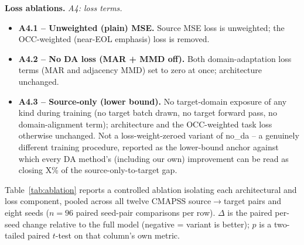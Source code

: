 \textbf{Loss ablations.}
\textit{A4: loss terms.}
\begin{itemize}
  \item \textbf{A4.1 -- Unweighted (plain) MSE.} Source MSE loss is unweighted; the OCC-weighted (near-EOL emphasis) loss is removed.
  \item \textbf{A4.2 -- No DA loss (MAR + MMD off).} Both domain-adaptation loss terms (MAR and adjacency MMD) set to zero at once; architecture unchanged.
  \item \textbf{A4.3 -- Source-only (lower bound).} No target-domain exposure of any kind during training (no target batch drawn, no target forward pass, no domain-alignment term); architecture and the OCC-weighted task loss otherwise unchanged. Not a loss-weight-zeroed variant of no\_da -- a genuinely different training procedure, reported as the lower-bound anchor against which every DA method's (including our own) improvement can be read as closing X\% of the source-only-to-target gap.
\end{itemize}

Table~\ref{tab:ablation} reports a controlled ablation isolating each architectural and loss component, pooled across all twelve CMAPSS source$\to$target pairs and eight seeds ($n{=}96$ paired seed-pair comparisons per row). $\Delta$ is the paired per-seed change relative to the full model (negative = variant is better); $p$ is a two-tailed paired $t$-test on that column's own metric.

